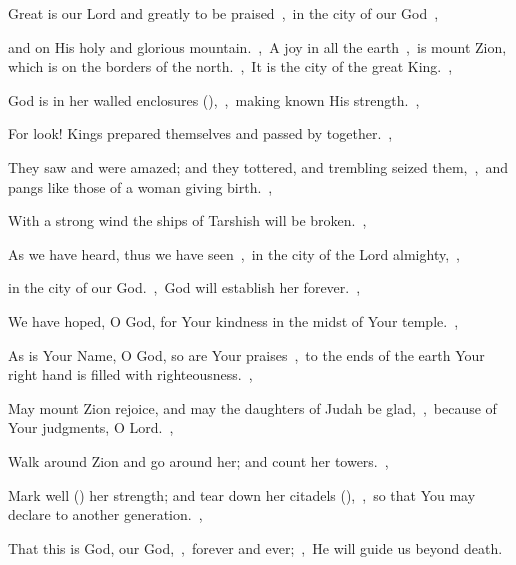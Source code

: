 \documentclass[12pt,twoside,a5paper]{article}
\begin{document}
\begin{normalparskip}
  Great is our Lord and greatly to be praised~\sep\ in the city of our God~\sep


  and on His holy and glorious mountain.~\sep\ A joy in all the earth~\sep\ is mount Zion, which is on the borders of the north.~\sep\ It is the city of the great King.~\sep

  God is in her walled enclosures (),~\sep\ making known His strength.~\sep

  For look! Kings prepared themselves and passed by together.~\sep

  They saw and were amazed; and they tottered, and trembling seized them,~\sep\ and pangs like those of a woman giving birth.~\sep

  With a strong wind the ships of Tarshish will be broken.~\sep

  As we have heard, thus we have seen~\sep\ in the city of the Lord almighty,~\sep

  in the city of our God.~\sep\ God will establish her forever.~\sep

  We have hoped, O God, for Your kindness in the midst of Your temple.~\sep

  As is Your Name, O God, so are Your praises~\sep\ to the ends of the earth Your right hand is filled with righteousness.~\sep

  May mount Zion rejoice, and may the daughters of Judah be glad,~\sep\ because of Your judgments, O Lord.~\sep

  Walk around Zion and go around her; and count her towers.~\sep

  Mark well () her strength; and tear down her citadels (),~\sep\ so that You may declare to another generation.~\sep

  That this is God, our God,~\sep\ forever and ever;~\sep\ He will guide us beyond death.
\end{normalparskip}

\end{document}
